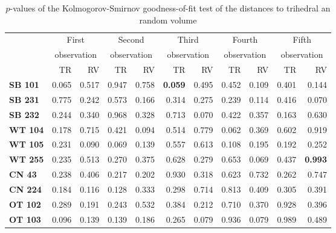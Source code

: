 \documentclass[12pt]{article}
\begin{document}
\begin{table}[hbt]
\centering
\caption{$p$-values of the Kolmogorov-Smirnov goodness-of-fit test of the distances to trihedral an random volume}\label{tab:pvalues_table}
\begin{tabular}{lrrrrrrrrrr}

\toprule
& \multicolumn{2}{c}{First} & \multicolumn{2}{c}{Second} & \multicolumn{2}{c}{Third} & \multicolumn{2}{c}{Fourth} & \multicolumn{2}{c}{Fifth}\\
& \multicolumn{2}{c}{observation} & \multicolumn{2}{c}{observation} & \multicolumn{2}{c}{observation} & \multicolumn{2}{c}{observation} & \multicolumn{2}{c}{observation}\\
& TR & RV & TR & RV & TR & RV & TR & RV& TR & RV\\
\cmidrule(lr){2-11}
\textbf{SB 101} & 0.065 & 0.517 & 0.947 & 0.758 & \textbf{0.059} & 0.495 & 0.452 & 0.109 & 0.401 & 0.144\\
\textbf{SB 231} & 0.775 & 0.242 & 0.573 & 0.166 & 0.314 & 0.275 & 0.239 & 0.114 & 0.416 & 0.070\\
\textbf{SB 232} & 0.244 & 0.340 & 0.968 & 0.328 & 0.713 & 0.070 & 0.422 & 0.357 & 0.163 & 0.630\\
\textbf{WT 104} & 0.178 & 0.715 & 0.421 & 0.094 & 0.514 & 0.779 & 0.062 & 0.369 & 0.602 & 0.919\\
\textbf{WT 105} & 0.231 & 0.090 & 0.069 & 0.139 & 0.557 & 0.613 & 0.108 & 0.195 & 0.192 & 0.252\\
\textbf{WT 255} & 0.235 & 0.513 & 0.270 & 0.375 & 0.628 & 0.279 & 0.653 & 0.069 & 0.437 & \textbf{0.993}\\
\textbf{CN 43}  & 0.238 & 0.406 & 0.217 & 0.202 & 0.930 & 0.318 & 0.623 & 0.732 & 0.262 & 0.747\\
\textbf{CN 224} & 0.184 & 0.116 & 0.128 & 0.333 & 0.298 & 0.714 & 0.813 & 0.409 & 0.305 & 0.391\\
\textbf{OT 102} & 0.289 & 0.191 & 0.243 & 0.532 & 0.384 & 0.212 & 0.710 & 0.370 & 0.928 & 0.396\\
\textbf{OT 103} & 0.096 & 0.139 & 0.139 & 0.186 & 0.265 & 0.079 & 0.936 & 0.079 & 0.989 & 0.489\\
\bottomrule
\end{tabular} 
\end{table}
\end{document}
